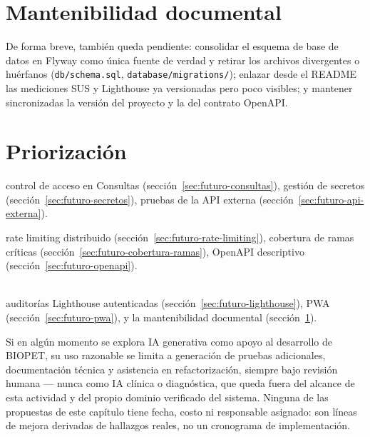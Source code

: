 \section{Mantenibilidad documental}
\label{sec:futuro-mantenibilidad}

De forma breve, tambi\'en queda pendiente: consolidar el esquema de base de
datos en Flyway como \'unica fuente de verdad y retirar los archivos
divergentes o hu\'erfanos (\texttt{db/schema.sql},
\texttt{database/migrations/}); enlazar desde el README las mediciones SUS y
Lighthouse ya versionadas pero poco visibles; y mantener sincronizadas la
versi\'on del proyecto y la del contrato OpenAPI.

\section{Priorizaci\'on}
\label{sec:futuro-priorizacion}

\begin{description}[nosep]
  \item[Corto plazo] control de acceso en Consultas
    (secci\'on~\ref{sec:futuro-consultas}), gesti\'on de secretos
    (secci\'on~\ref{sec:futuro-secretos}), pruebas de la API externa
    (secci\'on~\ref{sec:futuro-api-externa}).
  \item[Mediano plazo] rate limiting distribuido
    (secci\'on~\ref{sec:futuro-rate-limiting}), cobertura de ramas cr\'iticas
    (secci\'on~\ref{sec:futuro-cobertura-ramas}), OpenAPI descriptivo
    (secci\'on~\ref{sec:futuro-openapi}).
  \item[Evoluci\'on posterior] \mbox{}\\
    auditor\'ias Lighthouse autenticadas
    (secci\'on~\ref{sec:futuro-lighthouse}), PWA
    (secci\'on~\ref{sec:futuro-pwa}), y la mantenibilidad documental
    (secci\'on~\ref{sec:futuro-mantenibilidad}).
\end{description}

Si en alg\'un momento se explora IA generativa como apoyo al desarrollo de
BIOPET, su uso razonable se limita a generaci\'on de pruebas adicionales,
documentaci\'on t\'ecnica y asistencia en refactorizaci\'on, siempre bajo
revisi\'on humana --- nunca como IA cl\'inica o diagn\'ostica, que queda
fuera del alcance de esta actividad y del propio dominio verificado del
sistema. Ninguna de las propuestas de este cap\'itulo tiene fecha, costo ni
responsable asignado: son l\'ineas de mejora derivadas de hallazgos reales,
no un cronograma de implementaci\'on.
